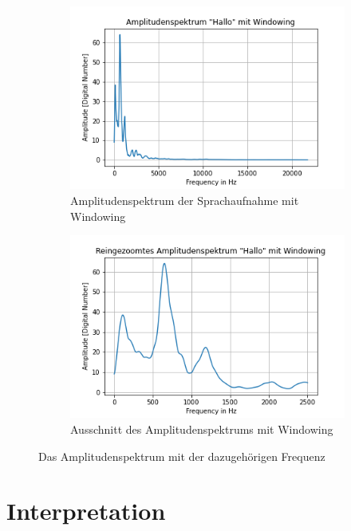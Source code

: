 \documentclass[12pt, oneside, a4paper, \docLanguage]{report}
\begin{document}
\begin{figure}[H]
\centering
	\begin{subfigure}{.5\textwidth}
  		\centering
 		 \includegraphics[width=.95\linewidth]{media/AmplitudenspektrumBreitWindow.png}
  		\caption{Amplitudenspektrum der Sprachaufnahme mit Windowing}
 		 \label{fig:VERSUCH_1_sub3}
	\end{subfigure}%
	\begin{subfigure}{.5\textwidth}
  		\centering
 		 \includegraphics[width=.95\linewidth]{media/AmplitudenspektrumSchmalWindow.png}
  		\caption{Ausschnitt des Amplitudenspektrums mit Windowing}
  		\label{fig:VERSUCH_1_sub4}
	\end{subfigure}
	\caption{Das Amplitudenspektrum mit der dazugehörigen Frequenz}
	\label{fig:VERSUCH_1_window}
\end{figure}

\section{Interpretation}
\label{chap:VERSUCH_1_INTERPRETATION}
\end{document}
